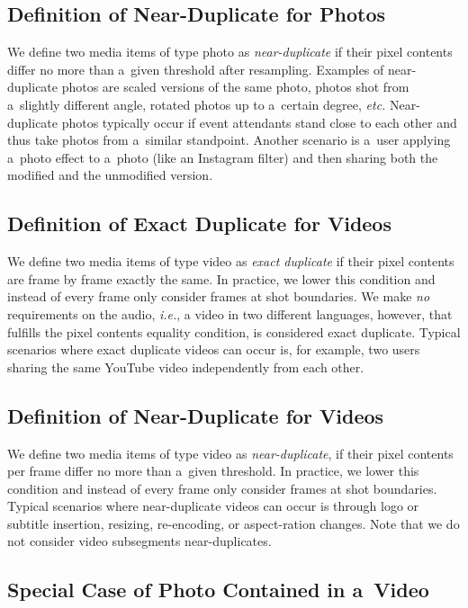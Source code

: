 \subsection{Definition of Near-Duplicate for Photos}

We define two media items of type photo as \emph{near-duplicate}
if their pixel contents differ no more than a~given threshold after resampling.
Examples of near-duplicate photos are scaled versions
of the same photo, photos shot from a~slightly different angle,
rotated photos up to a~certain degree, \emph{etc.}
Near-duplicate photos typically occur if event attendants
stand close to each other and thus take photos
from a~similar standpoint.
Another scenario is a~user applying a~photo effect to a~photo
(like an Instagram filter) and then sharing both the modified
and the unmodified version.

\subsection{Definition of Exact Duplicate for Videos}

We define two media items of type video as \emph{exact duplicate}
if their pixel contents are frame by frame exactly the same.
In practice, we lower this condition and instead of every frame
only consider frames at shot boundaries.
We make \emph{no} requirements on the audio, \emph{i.e.},
a video in two different languages, however, that fulfills the 
pixel contents equality condition, is considered exact duplicate.
Typical scenarios where exact duplicate videos can occur is,
for example, two users sharing the same YouTube video
independently from each other.

\subsection{Definition of Near-Duplicate for Videos}

We define two media items of type video as \emph{near-duplicate},
if their pixel contents per frame differ no more
than a~given threshold.
In practice, we lower this condition and instead of every frame
only consider frames at shot boundaries.
Typical scenarios where near-duplicate videos can occur is through
logo or subtitle insertion, resizing, re-encoding,
or aspect-ration changes.
Note that we do not consider video subsegments near-duplicates.

\subsection{Special Case of Photo Contained in a~Video}

